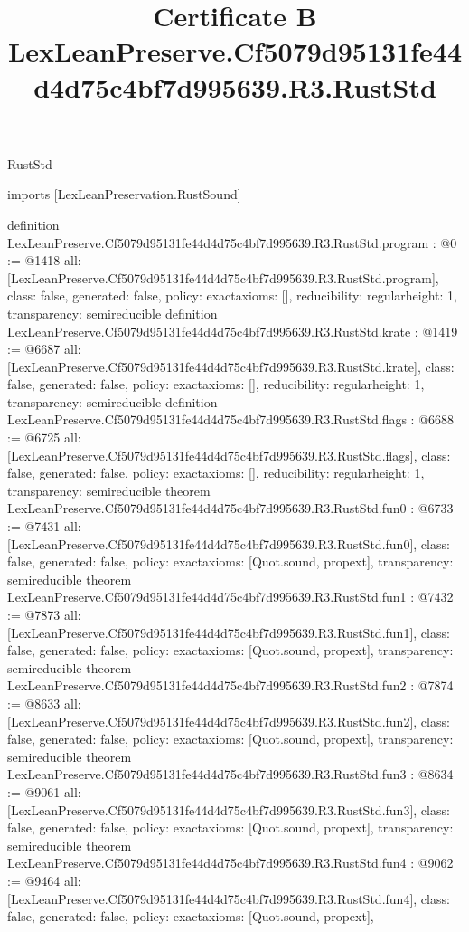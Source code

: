 \begin{lexlean}{RustStd}
\title{Certificate B LexLeanPreserve.Cf5079d95131fe44d4d75c4bf7d995639.R3.RustStd}
\begin{coremodule}
imports [LexLeanPreservation.RustSound]

definition LexLeanPreserve.Cf5079d95131fe44d4d75c4bf7d995639.R3.RustStd.program : @0 := @1418 {
  all: [LexLeanPreserve.Cf5079d95131fe44d4d75c4bf7d995639.R3.RustStd.program],
  class: false,
  generated: false,
  policy: exact{axioms: []},
  reducibility: regular{height: 1},
  transparency: semireducible
}
definition LexLeanPreserve.Cf5079d95131fe44d4d75c4bf7d995639.R3.RustStd.krate : @1419 := @6687 {
  all: [LexLeanPreserve.Cf5079d95131fe44d4d75c4bf7d995639.R3.RustStd.krate],
  class: false,
  generated: false,
  policy: exact{axioms: []},
  reducibility: regular{height: 1},
  transparency: semireducible
}
definition LexLeanPreserve.Cf5079d95131fe44d4d75c4bf7d995639.R3.RustStd.flags : @6688 := @6725 {
  all: [LexLeanPreserve.Cf5079d95131fe44d4d75c4bf7d995639.R3.RustStd.flags],
  class: false,
  generated: false,
  policy: exact{axioms: []},
  reducibility: regular{height: 1},
  transparency: semireducible
}
theorem LexLeanPreserve.Cf5079d95131fe44d4d75c4bf7d995639.R3.RustStd.fun0 : @6733 := @7431 {
  all: [LexLeanPreserve.Cf5079d95131fe44d4d75c4bf7d995639.R3.RustStd.fun0],
  class: false,
  generated: false,
  policy: exact{axioms: [Quot.sound, propext]},
  transparency: semireducible
}
theorem LexLeanPreserve.Cf5079d95131fe44d4d75c4bf7d995639.R3.RustStd.fun1 : @7432 := @7873 {
  all: [LexLeanPreserve.Cf5079d95131fe44d4d75c4bf7d995639.R3.RustStd.fun1],
  class: false,
  generated: false,
  policy: exact{axioms: [Quot.sound, propext]},
  transparency: semireducible
}
theorem LexLeanPreserve.Cf5079d95131fe44d4d75c4bf7d995639.R3.RustStd.fun2 : @7874 := @8633 {
  all: [LexLeanPreserve.Cf5079d95131fe44d4d75c4bf7d995639.R3.RustStd.fun2],
  class: false,
  generated: false,
  policy: exact{axioms: [Quot.sound, propext]},
  transparency: semireducible
}
theorem LexLeanPreserve.Cf5079d95131fe44d4d75c4bf7d995639.R3.RustStd.fun3 : @8634 := @9061 {
  all: [LexLeanPreserve.Cf5079d95131fe44d4d75c4bf7d995639.R3.RustStd.fun3],
  class: false,
  generated: false,
  policy: exact{axioms: [Quot.sound, propext]},
  transparency: semireducible
}
theorem LexLeanPreserve.Cf5079d95131fe44d4d75c4bf7d995639.R3.RustStd.fun4 : @9062 := @9464 {
  all: [LexLeanPreserve.Cf5079d95131fe44d4d75c4bf7d995639.R3.RustStd.fun4],
  class: false,
  generated: false,
  policy: exact{axioms: [Quot.sound, propext]},
}
\end{coremodule}
\end{lexlean}

